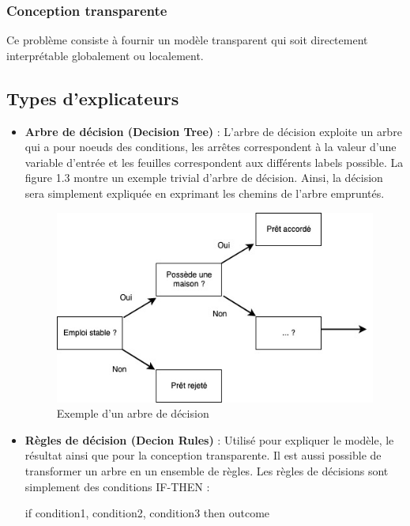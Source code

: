 \subsubsection{Conception transparente}
Ce problème consiste à fournir un modèle transparent qui soit directement interprétable globalement ou localement.

\subsection{Types d'explicateurs}
\begin{itemize}
    \item \textbf{Arbre de décision (Decision Tree)} : L'arbre de décision exploite un arbre qui a pour noeuds des conditions, les arrêtes correspondent à la valeur d'une variable d'entrée et les feuilles correspondent aux différents labels possible. La figure 1.3 montre un exemple trivial d'arbre de décision. Ainsi, la décision sera simplement expliquée en exprimant les chemins de l'arbre empruntés. 

    \begin{figure}[h]
    \centering
    \includegraphics[scale=0.5]{src_img/decision_tree.jpg}
    \caption{Exemple d'un arbre de décision}
    \label{decision_tree}
    \end{figure}
    
    \item \textbf{Règles de décision (Decion Rules)} : Utilisé pour expliquer le modèle, le résultat ainsi que pour la conception transparente. Il est aussi possible de transformer un arbre en un ensemble de règles. Les règles de décisions sont simplement des conditions IF-THEN : 
    
    if condition1, condition2, condition3 then outcome 
    

\end{itemize}
